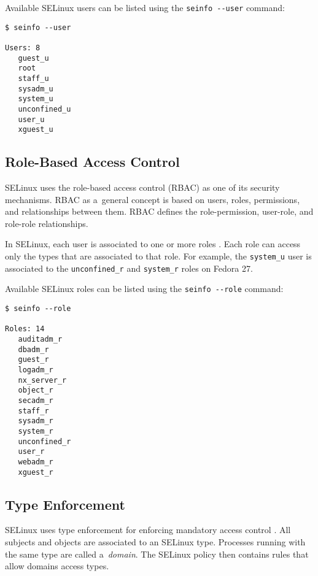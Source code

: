 Available SELinux users can be listed using the \texttt{seinfo -{}-user}
command:
\begin{lstlisting}
$ seinfo --user

Users: 8
   guest_u
   root
   staff_u
   sysadm_u
   system_u
   unconfined_u
   user_u
   xguest_u
\end{lstlisting}

\subsection{Role-Based Access Control}
\label{rbac}
SELinux uses the role-based access control (RBAC) as one of its security
mechanisms. RBAC as a~general concept is based on users, roles, permissions,
and relationships between them. RBAC defines the role-permission, user-role, and
role-role relationships.

In SELinux, each user is associated to one or more roles \cite[p.~24]{tsn}.
Each role can access only the types that are associated to that role. For
example, the \texttt{system\_u} user is associated to the
\texttt{unconfined\_r} and \texttt{system\_r} roles on Fedora 27.

Available SELinux roles can be listed using the \texttt{seinfo -{}-role}
command:
\begin{lstlisting}
$ seinfo --role

Roles: 14
   auditadm_r
   dbadm_r
   guest_r
   logadm_r
   nx_server_r
   object_r
   secadm_r
   staff_r
   sysadm_r
   system_r
   unconfined_r
   user_r
   webadm_r
   xguest_r
\end{lstlisting}

\subsection{Type Enforcement}
\label{te}
SELinux uses type enforcement for enforcing mandatory access control
\cite[pp.~25--26]{tsn}. All subjects and objects are associated to an SELinux
type. Processes running with the same type are called a~\emph{domain}. The
SELinux policy then contains rules that allow domains access types.

